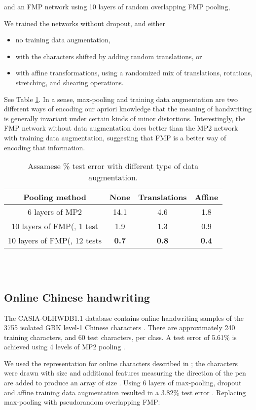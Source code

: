 \documentclass[english]{article}
\begin{document}
and an FMP network using 10 layers of random overlapping FMP
pooling,

We trained the networks without dropout, and either
\begin{itemize}
\item no training data augmentation,
\item with the characters shifted by adding random translations, or
\item with affine transformations, using a randomized mix of translations,
rotations, stretching, and shearing operations.
\end{itemize}
See Table \ref{tab:Assamese-=000025-test}. In a sense, max-pooling
and training data augmentation are two different ways of encoding
our apriori knowledge that the meaning of handwriting is generally
invariant under certain kinds of minor distortions. Interestingly,
the FMP network without data augmentation does better than the MP2
network with training data augmentation, suggesting that FMP is a
better way of encoding that information.

\begin{table}
\centering{}\begin{tabular}{|c|ccc|}
\hline
Pooling method & None & Translations & Affine\\
\hline
6 layers of MP2 & 14.1 & 4.6 & 1.8\\
10 layers of FMP(, 1 test & 1.9 & 1.3 & 0.9\\
10 layers of FMP(, 12 tests & \textbf{0.7} & \textbf{0.8} & \textbf{0.4}\\
\hline
\end{tabular}
\ \\
\ \\
\caption{Assamese \% test error with different type of data augmentation.\label{tab:Assamese-=000025-test}}
\end{table}



\subsection{Online Chinese handwriting}

The CASIA-OLHWDB1.1 database contains online handwriting samples of
the 3755 isolated GBK level-1 Chinese characters \cite{CASIA}. There are approximately
240 training characters, and 60 test characters, per class. A test
error of 5.61\% is achieved using 4 levels of MP2 pooling \cite{multicolumndeep}.

We used the representation for online characters described in \cite{GrahamSparse}; the characters were drawn with size  and additional features measuring the direction of the pen are added to produce an array of size . Using 6 layers of  max-pooling, dropout and affine training data augmentation
resulted in a 3.82\% test error \cite{GrahamSparse}.
Replacing max-pooling
with pseudorandom overlapping FMP:
\end{document}

